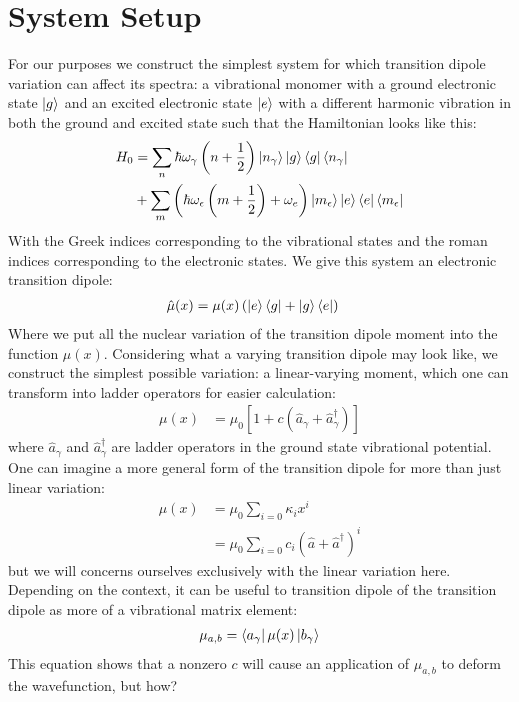 \section{System Setup}
For our purposes we construct the simplest system for which transition dipole variation can affect its spectra: a vibrational monomer with a ground electronic state $\ket{g}$ and an excited electronic state $\ket{e}$ with a different harmonic vibration in both the ground and excited state such that the Hamiltonian looks like this:
\begin{align}
	H_0 &=  \sum_n \hbar \omega_{\gamma}  \left(n + \frac{1}{2} \right)  \ket{n_{\gamma}}\ket{g}\bra{g} \bra{n_{\gamma}} \\
   &+ \sum_m \left(  \hbar \omega_{\epsilon}  \left(m + \frac{1}{2} \right) + \omega_e \right)  \ket{m_{\epsilon}} \ket{e}\bra{e} \bra{m_{\epsilon}}
\end{align}
With the Greek indices corresponding to the vibrational states and the roman indices corresponding to the electronic states.  We give this system an electronic transition dipole:
\begin{align}
	\hat{\mu}(x) &= \mu (x)  \left( \ket{e}\bra{g} + \ket{g} \bra{e} \right)
\end{align}
Where we put all the nuclear variation of the transition dipole moment into the function $\mu(x)$.  Considering what a varying transition dipole may look like, we construct the simplest possible variation: a linear-varying moment, which one can transform into ladder operators for easier calculation:
\begin{align}
	\mu(x) &= \mu_0 \left[ 1 + c \left( \hat{a}_{\gamma} + \hat{a}_{\gamma}^{\dagger}\right)  \right]
\end{align}
where $\hat{a}_{\gamma}$ and $\hat{a}_{\gamma}^{\dagger}$ are ladder operators in the ground state vibrational potential.  One can imagine a more general form of the transition dipole for more than just linear variation:
\begin{align}
	\mu(x) &= \mu_0 \sum_{i=0} \kappa_i x^i \\
	&= \mu_0 \sum_{i=0} c_i \left( \hat{a} + \hat{a}^{\dagger}\right)^i
\end{align}
but we will concerns ourselves exclusively with the linear variation here.  Depending on the context, it can be useful to transition dipole  of the transition dipole as more of a vibrational matrix element:
\begin{align}
	\mu_{a,b} = \bra{a_{\gamma}} \mu(x) \ket{b_{\gamma}}
\end{align}
This equation shows that a nonzero $c$ will cause an application of $ \mu_{a,b}$ to deform the wavefunction, but how?




